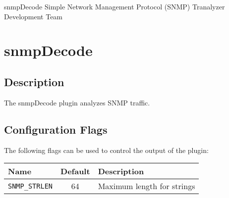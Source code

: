 \documentclass[documentation]{subfiles}
\begin{document}
\trantitle
    {snmpDecode} %
    {Simple Network Management Protocol (SNMP)} %
    {Tranalyzer Development Team} %

\section{snmpDecode}\label{s:snmpDecode}

\subsection{Description}
The snmpDecode plugin analyzes SNMP traffic.







\subsection{Configuration Flags}
The following flags can be used to control the output of the plugin:
\begin{longtable}{lcl}
    \toprule
    {\bf Name} & {\bf Default} & {\bf Description}\\
    \midrule\endhead%
    {\tt SNMP\_STRLEN} & 64 & Maximum length for strings\\
    \bottomrule
\end{longtable}
\end{document}
